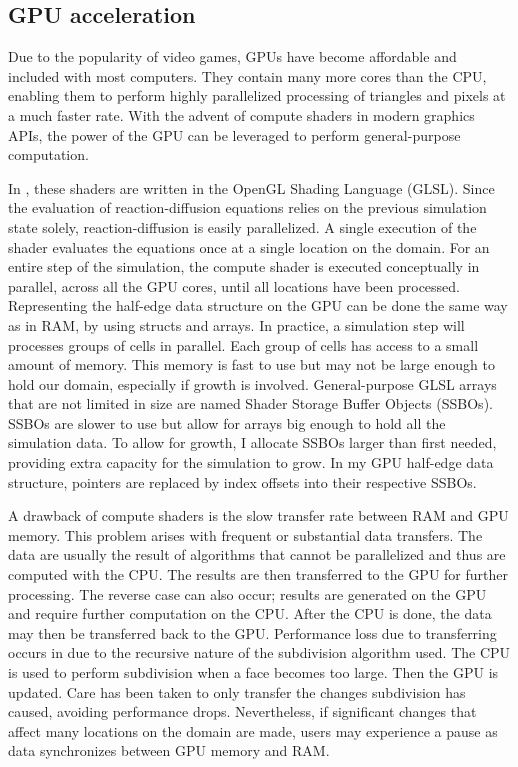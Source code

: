 \subsection{GPU acceleration}
Due to the popularity of video games, GPUs have become affordable and included with most computers. They contain many more cores than the CPU, enabling them to perform highly parallelized processing of triangles and pixels at a much faster rate. With the advent of compute shaders in modern graphics APIs, the power of the GPU can be leveraged to perform general-purpose computation. 

In \ProgramName{}, these shaders are written in the OpenGL Shading Language (GLSL). Since the evaluation of reaction-diffusion equations relies on the previous simulation state solely, reaction-diffusion is easily parallelized. A single execution of the shader evaluates the equations once at a single location on the domain. For an entire step of the simulation, the compute shader is executed conceptually in parallel, across all the GPU cores, until all locations have been processed. Representing the half-edge data structure on the GPU can be done the same way as in RAM, by using structs and arrays. In practice, a simulation step will processes groups of cells in parallel. Each group of cells has access to a small amount of memory. This memory is fast to use but may not be large enough to hold our domain, especially if growth is involved. General-purpose GLSL arrays that are not limited in size are named Shader Storage Buffer Objects (SSBOs). SSBOs are slower to use but allow for arrays big enough to hold all the simulation data. To allow for growth, I allocate SSBOs larger than first needed, providing extra capacity for the simulation to grow. In my GPU half-edge data structure, pointers are replaced by index offsets into their respective SSBOs.

A drawback of compute shaders is the slow transfer rate between RAM and GPU memory. This problem arises with frequent or substantial data transfers. The data are usually the result of algorithms that cannot be parallelized and thus are computed with the CPU. The results are then transferred to the GPU for further processing. The reverse case can also occur; results are generated on the GPU and require further computation on the CPU. After the CPU is done, the data may then be transferred back to the GPU. Performance loss due to transferring occurs in \ProgramName{} due to the recursive nature of the subdivision algorithm used. The CPU is used to perform subdivision when a face becomes too large. Then the GPU is updated. Care has been taken to only transfer the changes subdivision has caused, avoiding performance drops. Nevertheless, if significant changes that affect many locations on the domain are made, users may experience a pause as data synchronizes between GPU memory and RAM. 

